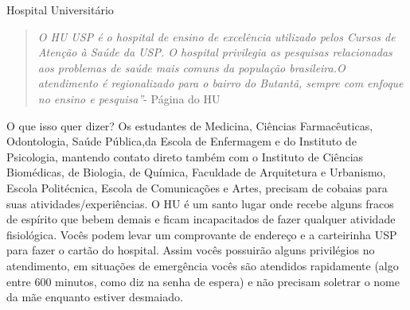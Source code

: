 \begin{secao}{Hospital Universitário}
   \begin{quote}\emph{O HU USP é o hospital de ensino de excelência utilizado
pelos Cursos de Atenção à Saúde da USP.  O hospital privilegia as pesquisas
relacionadas aos problemas de saúde  mais comuns da população brasileira.O
atendimento é regionalizado para o bairro do Butantã, sempre com enfoque no
ensino e pesquisa''}- Página do HU
   \end{quote}

O que isso quer dizer? Os estudantes de Medicina, Ciências Farmacêuticas,
Odontologia, Saúde Pública,da Escola de Enfermagem e do Instituto de
Psicologia, mantendo contato direto também com o Instituto de Ciências
Biomédicas, de Biologia, de Química, Faculdade de Arquitetura e Urbanismo,
Escola Politécnica, Escola de Comunicações e Artes, precisam de cobaias para
suas atividades/experiências. O HU é um santo lugar onde recebe alguns fracos
de espírito que bebem demais e ficam incapacitados de fazer qualquer atividade
fisiológica. Vocês podem levar um comprovante de endereço e a
carteirinha USP para fazer o cartão do hospital. Assim vocês possuirão alguns
privilégios no atendimento, em situações de emergência vocês são atendidos
rapidamente (algo entre 600 minutos, como diz na senha de espera) e não
precisam soletrar o nome da mãe enquanto estiver desmaiado.

\end{secao}

